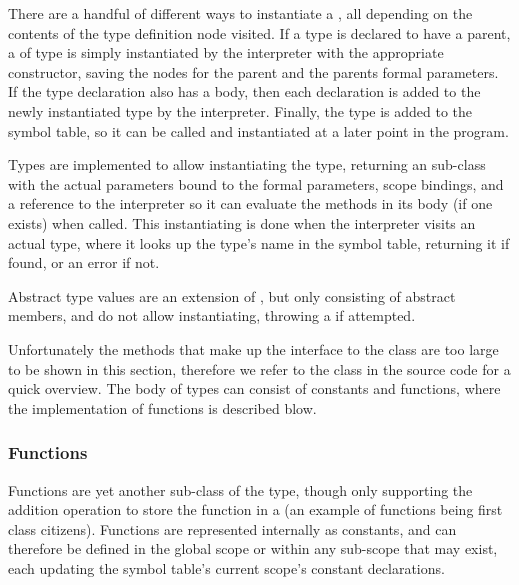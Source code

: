 There are a handful of different ways to instantiate a ,
all depending on the contents of the type definition node visited.
If a type is declared to have a parent, a  of type
 is simply instantiated by the interpreter with the
appropriate constructor, saving the nodes for the parent and the parents
formal parameters. If the type declaration also has a body, then each
declaration is added to the newly instantiated type by the interpreter.
Finally, the type is added to the symbol table, so it can be called and
instantiated at a later point in the program.

Types are implemented to allow instantiating the type, returning an
 sub-class with the actual parameters bound to the
formal parameters, scope bindings, and a reference to the interpreter
so it can evaluate the methods in its body (if one exists) when called.
This instantiating is done when the interpreter visits an actual type,
where it looks up the type's name in the symbol table, returning it if
found, or an error if not.

Abstract type values are an extension of , but only
consisting of abstract members, and do not allow instantiating, throwing
a  if attempted.

Unfortunately the methods that make up the interface to the
 class are too large to be shown in this section,
therefore we refer to the  class in the source code
for a quick overview. The body of types can consist of constants and
functions, where the implementation of functions is described blow.

\subsubsection{Functions}
Functions are yet another sub-class of the  type,
though only supporting the addition operation to store the function in
a  (an example of functions being first class citizens).
Functions are represented internally as constants, and can therefore be
defined in the global scope or within any sub-scope that may exist, each
updating the symbol table's current scope's constant declarations.

